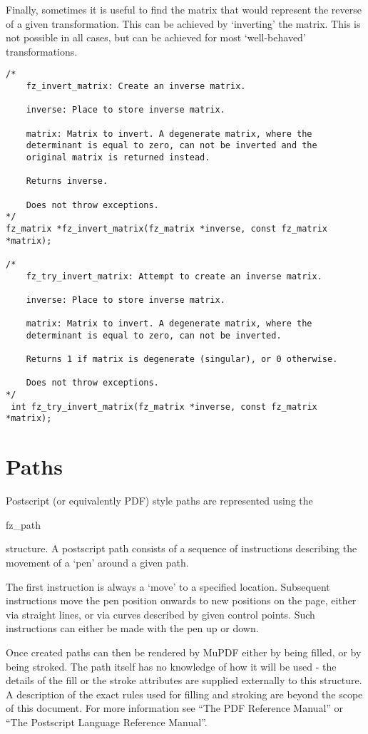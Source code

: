 \documentclass[oneside]{book}
\begin{document}
Finally, sometimes it is useful to find the matrix that would represent the reverse of a given transformation. This can be achieved by `inverting' the matrix. This is not possible in all cases, but can be achieved for most `well-behaved' transformations.

\begin{lstlisting}
/*
	fz_invert_matrix: Create an inverse matrix.

	inverse: Place to store inverse matrix.

	matrix: Matrix to invert. A degenerate matrix, where the
	determinant is equal to zero, can not be inverted and the
	original matrix is returned instead.

	Returns inverse.

	Does not throw exceptions.
*/
fz_matrix *fz_invert_matrix(fz_matrix *inverse, const fz_matrix *matrix);

/*
	fz_try_invert_matrix: Attempt to create an inverse matrix.

	inverse: Place to store inverse matrix.

	matrix: Matrix to invert. A degenerate matrix, where the
	determinant is equal to zero, can not be inverted.

	Returns 1 if matrix is degenerate (singular), or 0 otherwise.

	Does not throw exceptions.
*/
 int fz_try_invert_matrix(fz_matrix *inverse, const fz_matrix *matrix);
\end{lstlisting}

\section{Paths}

Postscript (or equivalently PDF) style paths are represented using the \begin{tt}fz\_path\end{tt} structure.  A postscript path consists of a sequence of instructions describing the movement of a `pen' around a given path.

The first instruction is always a `move' to a specified location. Subsequent instructions move the pen position onwards to new positions on the page, either via straight lines, or via curves described by given control points. Such instructions can either be made with the pen up or down.

Once created paths can then be rendered by MuPDF either by being filled, or by being stroked. The path itself has no knowledge of how it will be used - the details of the fill or the stroke attributes are supplied externally to this structure. A description of the exact rules used for filling and stroking are beyond the scope of this document. For more information see ``The PDF Reference Manual'' or ``The Postscript Language Reference Manual''.
\end{document}

